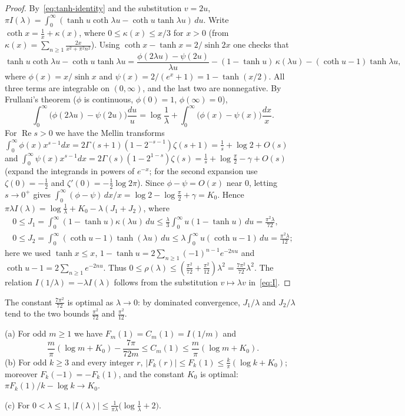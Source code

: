 \begin{proof}
By~\eqref{eq:tanh-identity} and the substitution $v=2u$, $\pi I(\lambda)=\int_0^\infty(\tanh u\coth\lambda u-\coth u\tanh\lambda u)\,du$. Write $\coth x=\frac1x+\kappa(x)$, where $0\le\kappa(x)\le x/3$ for $x>0$ (from $\kappa(x)=\sum_{n\ge1}\frac{2x}{x^2+\pi^2n^2}$). Using $\coth x-\tanh x=2/\sinh2x$ one checks that
\[
\tanh u\coth\lambda u-\coth u\tanh\lambda u=\frac{\phi(2\lambda u)-\psi(2u)}{\lambda u}-(1-\tanh u)\,\kappa(\lambda u)-(\coth u-1)\tanh\lambda u,
\]
where $\phi(x)=x/\sinh x$ and $\psi(x)=2/(e^x+1)=1-\tanh(x/2)$. All three terms are integrable on $(0,\infty)$, and the last two are nonnegative. By Frullani's theorem ($\phi$ is continuous, $\phi(0)=1$, $\phi(\infty)=0$),
\[
\int_0^\infty\bigl(\phi(2\lambda u)-\psi(2u)\bigr)\frac{du}u=\log\frac1\lambda+\int_0^\infty\bigl(\phi(x)-\psi(x)\bigr)\frac{dx}x.
\]
For $\operatorname{Re}s>0$ we have the Mellin transforms $\int_0^\infty\phi(x)x^{s-1}dx=2\Gamma(s+1)(1-2^{-s-1})\zeta(s+1)=\frac1s+\log2+O(s)$ and $\int_0^\infty\psi(x)x^{s-1}dx=2\Gamma(s)(1-2^{1-s})\zeta(s)=\frac1s+\log\frac\pi2-\gamma+O(s)$ (expand the integrands in powers of $e^{-x}$; for the second expansion use $\zeta(0)=-\frac12$ and $\zeta'(0)=-\frac12\log2\pi$). Since $\phi-\psi=O(x)$ near $0$, letting $s\to0^+$ gives $\int_0^\infty(\phi-\psi)\,dx/x=\log2-\log\frac\pi2+\gamma=K_0$. Hence $\pi\lambda I(\lambda)=\log\frac1\lambda+K_0-\lambda(J_1+J_2)$, where
\begin{gather*}
0\le J_1=\int_0^\infty(1-\tanh u)\kappa(\lambda u)\,du\le\frac\lambda3\int_0^\infty u(1-\tanh u)\,du=\frac{\pi^2\lambda}{72},\\
0\le J_2=\int_0^\infty(\coth u-1)\tanh(\lambda u)\,du\le\lambda\int_0^\infty u(\coth u-1)\,du=\frac{\pi^2\lambda}{12};
\end{gather*}
here we used $\tanh x\le x$, $1-\tanh u=2\sum_{n\ge1}(-1)^{n-1}e^{-2nu}$ and $\coth u-1=2\sum_{n\ge1}e^{-2nu}$. Thus $0\le\rho(\lambda)\le(\frac{\pi^2}{72}+\frac{\pi^2}{12})\lambda^2=\frac{7\pi^2}{72}\lambda^2$. The relation $I(1/\lambda)=-\lambda I(\lambda)$ follows from the substitution $v\mapsto\lambda v$ in~\eqref{eq:I}.
\end{proof}

The constant $\frac{7\pi^2}{72}$ is optimal as $\lambda\to0$: by dominated convergence, $J_1/\lambda$ and $J_2/\lambda$ tend to the two bounds $\frac{\pi^2}{72}$ and $\frac{\pi^2}{12}$.

\begin{corollary}\label{cor:Cm1}
\textup{(a)} For odd $m\ge1$ we have $F_m(1)=C_m(1)=I(1/m)$ and
\[
\frac m\pi(\log m+K_0)-\frac{7\pi}{72m}\le C_m(1)\le\frac m\pi(\log m+K_0).
\]
\textup{(b)} For odd $k\ge3$ and every integer $r$, $|F_k(r)|\le F_k(1)\le\frac k\pi(\log k+K_0)$; moreover $F_k(-1)=-F_k(1)$, and the constant $K_0$ is optimal: $\pi F_k(1)/k-\log k\to K_0$.

\textup{(c)} For $0<\lambda\le1$, $|I(\lambda)|\le\frac1{\pi\lambda}\bigl(\log\frac1\lambda+2\bigr)$.
\end{corollary}

